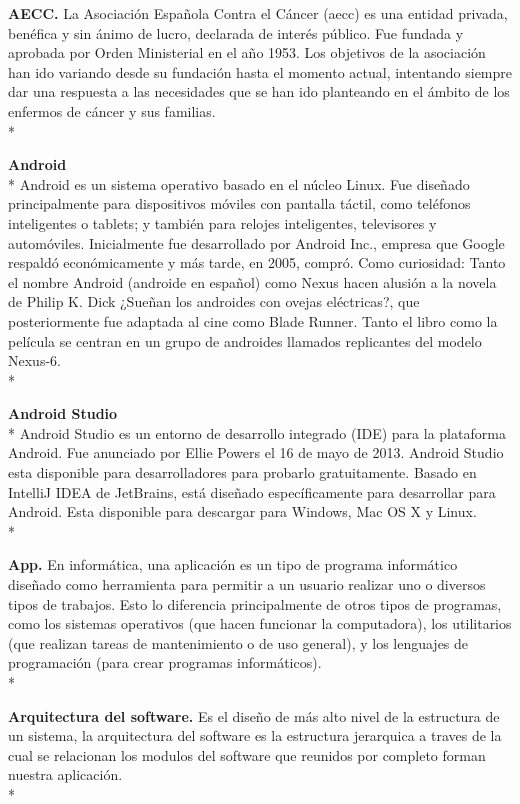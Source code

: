 \documentclass[../pfc.tex]{subfiles}
\begin{document}
	
	\textbf{AECC.}
	La Asociación Española Contra el Cáncer (aecc) es una entidad privada, benéfica y sin ánimo de lucro, declarada de interés público. Fue fundada y aprobada por Orden Ministerial en el año 1953.
	Los objetivos de la asociación han ido variando desde su fundación hasta el momento actual, intentando siempre dar una respuesta a las necesidades que se han ido planteando en el ámbito de los enfermos de cáncer y sus familias.\\*
	
	\textbf{Android}\\*
	Android es un sistema operativo basado en el núcleo Linux. Fue diseñado principalmente para dispositivos móviles con pantalla táctil, como teléfonos inteligentes o tablets; y también para relojes inteligentes, televisores y automóviles. Inicialmente fue desarrollado por Android Inc., empresa que Google respaldó económicamente y más tarde, en 2005, compró. Como curiosidad: Tanto el nombre Android (androide en español) como Nexus hacen alusión a la novela de Philip K. Dick ¿Sueñan los androides con ovejas eléctricas?, que posteriormente fue adaptada al cine como Blade Runner. Tanto el libro como la película se centran en un grupo de androides llamados replicantes del modelo Nexus-6.\\*
	
	\textbf{Android Studio}\\*
	Android Studio es un entorno de desarrollo integrado (IDE) para la plataforma Android. Fue anunciado por Ellie Powers el 16 de mayo de 2013. Android Studio esta disponible para desarrolladores para probarlo gratuitamente. Basado en IntelliJ IDEA de JetBrains, está diseñado específicamente para desarrollar para Android. Esta disponible para descargar para Windows, Mac OS X y Linux.\\*
	
	\textbf{App.}
	En informática, una aplicación es un tipo de programa informático diseñado como herramienta para permitir a un usuario realizar uno o diversos tipos de trabajos. Esto lo diferencia principalmente de otros tipos de programas, como los sistemas operativos (que hacen funcionar la computadora), los utilitarios (que realizan tareas de mantenimiento o de uso general), y los lenguajes de programación (para crear programas informáticos).\\*
	
	\textbf{Arquitectura del software.}
	Es el diseño de más alto nivel de la estructura de un sistema, la arquitectura del software es la estructura jerarquica a traves de la cual se relacionan los modulos del software que reunidos por completo forman nuestra aplicación.\\*
	
\end{document}
